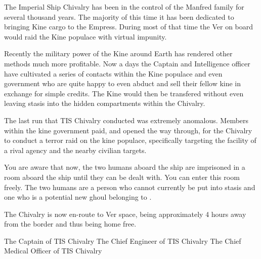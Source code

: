 \documentclass[blue]{guildcamp4}
\begin{document}
\name{\bChivalry{}}

The Imperial Ship Chivalry has been in the control of the Manfred family for several thousand years. The majority of this time it has been dedicated to bringing Kine cargo to the Empress. During most of that time the Ver on board would raid the Kine populace with virtual impunity.

Recently the military power of the Kine around Earth has rendered other methods much more profitable. Now a days the Captain and Intelligence officer have cultivated a series of contacts within the Kine populace and even government who are quite happy to even abduct and sell their fellow kine in exchange for simple credits. The Kine would then be transfered without even leaving stasis into the hidden compartments within the Chivalry. 

The last run that TIS Chivalry conducted was extremely anomalous. Members within the kine government paid, and opened the way through, for the Chivalry to conduct a terror raid on the kine populace, specifically targeting the facility of a rival agency and the nearby civilian targets. 

You are aware that now, the two humans aboard the ship are imprisoned in a room aboard the ship until they can be dealt with. You can enter this room freely. The two humans are a person who cannot currently be put into stasis and one who is a potential new ghoul belonging to \cVone{}.

The Chivalry is now en-route to Ver space, being approximately 4 hours away from the border and thus being home free.


\begin{members}
	\member{\cVone{}} The Captain of TIS Chivalry
	\member{\cVtwo{}} The Chief Engineer of TIS Chivalry
	\member{\cVthree{}} The Chief Medical Officer of TIS Chivalry
	
\end{members}
\end{document}
